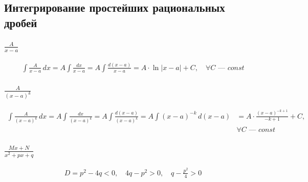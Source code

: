 \subsection{Интегрирование простейших рациональных дробей}
\subsubsection{$\frac{A}{x - a}$}

\begin{align*}
    \int \frac{A}{x - a}\, dx = A \int \frac{dx}{x - a} = A \int \frac{d(x - a)}{x - a} = A \cdot \ln |x - a| + C,\quad \forall C \text{ --- } const
\end{align*}

\subsubsection{$\frac{A}{(x-a)^k}$}

\begin{align*}
    \int \frac{A}{(x - a)^k}\, dx = A \int \frac{dx}{(x-a)^k} = A \int \frac{d(x-a)}{(x-a)^k} = A \int (x - a)^{-k}\, d(x-a) &= A\cdot \frac{(x - a)^{-k + 1}}{-k + 1} + C, \\
    & \forall C \text{ --- } const
\end{align*}

\newpage
\subsubsection{$\frac{Mx + N}{x^2 + px + q}$}

\begin{gather*}
    D = p^2 - 4q < 0,\quad 4q - p^2 > 0,\quad \boxed{q - \frac{p^2}{4} > 0} \tag{$*$}
\end{gather*} \vspace{-2\topsep}

